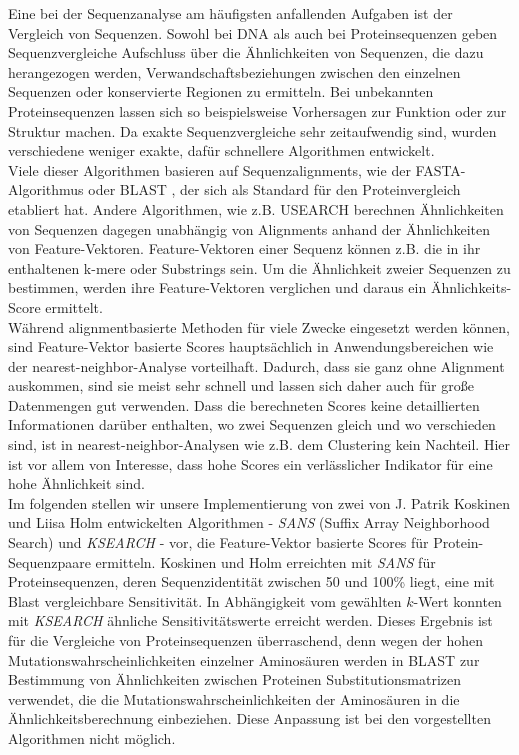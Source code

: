\documentclass{article}
\begin{document}
Eine bei der Sequenzanalyse am häufigsten anfallenden Aufgaben ist der Vergleich
von Sequenzen. 
Sowohl bei DNA als auch bei Proteinsequenzen geben Sequenzvergleiche Aufschluss über die Ähnlichkeiten von Sequenzen, die dazu herangezogen werden, Verwandschaftsbeziehungen zwischen den einzelnen Sequenzen oder konservierte Regionen zu ermitteln. Bei unbekannten Proteinsequenzen lassen sich so beispielsweise Vorhersagen zur Funktion oder zur Struktur machen. Da exakte Sequenzvergleiche sehr zeitaufwendig sind, wurden verschiedene weniger exakte, dafür schnellere Algorithmen entwickelt.\\
Viele dieser Algorithmen basieren auf Sequenzalignments, wie der FASTA-Algorithmus \cite{FASTA} oder BLAST \cite{BLAST}, der sich als Standard für den Proteinvergleich etabliert hat.
Andere Algorithmen, wie z.B. USEARCH \cite{USEARCH} berechnen Ähnlichkeiten von Sequenzen dagegen unabhängig von Alignments anhand der Ähnlichkeiten von Feature-Vektoren. 
Feature-Vektoren einer Sequenz können z.B. die in ihr enthaltenen k-mere oder Substrings sein. 
Um die Ähnlichkeit zweier Sequenzen zu bestimmen, werden ihre Feature-Vektoren verglichen und daraus ein Ähnlichkeits-Score ermittelt.\\
Während alignmentbasierte Methoden für viele Zwecke eingesetzt werden können, sind Feature-Vektor basierte Scores hauptsächlich in Anwendungsbereichen wie der nearest-neighbor-Analyse vorteilhaft. 
Dadurch, dass sie ganz ohne Alignment auskommen, sind sie meist sehr schnell und lassen sich daher auch für große Datenmengen gut verwenden. 
Dass die berechneten Scores keine detaillierten Informationen darüber enthalten,
wo zwei Sequenzen gleich und wo verschieden sind, ist in nearest-neighbor-Analysen wie z.B. dem Clustering kein Nachteil. 
Hier ist vor allem von Interesse, dass hohe Scores ein verlässlicher Indikator für eine hohe Ähnlichkeit sind.\\
Im folgenden stellen wir unsere Implementierung von zwei von J. Patrik Koskinen und Liisa Holm entwickelten Algorithmen - \emph{SANS} (Suffix Array Neighborhood Search) und \emph{KSEARCH} - vor, die Feature-Vektor basierte Scores für Protein-Sequenzpaare ermitteln. Koskinen und Holm erreichten mit \emph{SANS} für Proteinsequenzen, deren Sequenzidentität zwischen 50 und 100\% liegt, eine mit Blast vergleichbare Sensitivität. In Abhängigkeit vom gewählten $k$-Wert konnten mit \emph{KSEARCH} ähnliche Sensitivitätswerte erreicht werden. Dieses Ergebnis ist für die Vergleiche von Proteinsequenzen überraschend, denn wegen der hohen Mutationswahrscheinlichkeiten einzelner Aminosäuren werden in BLAST zur Bestimmung von Ähnlichkeiten zwischen Proteinen Substitutionsmatrizen verwendet, die die Mutationswahrscheinlichkeiten der Aminosäuren in die Ähnlich\-keitsberechnung einbeziehen. 
Diese Anpassung ist bei den vorgestellten Algorithmen nicht möglich.
\end{document}
